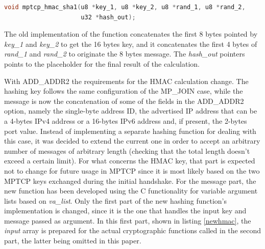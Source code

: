 \begin{lstlisting}[language=c, caption=\textit{Prototype for the old \textit{mptcp\_hmac\_sha1() function}}, label=oldhmac]
void mptcp_hmac_sha1(u8 *key_1, u8 *key_2, u8 *rand_1, u8 *rand_2, 
                     u32 *hash_out);
\end{lstlisting}
 
The old implementation of the function concatenates the first 8 bytes pointed by \textit{key\_1} and \textit{key\_2} to get the 16 bytes key, and it concatenates the first 4 bytes of \textit{rand\_1} and \textit{rand\_2} to originate the 8 bytes message. The \textit{hash\_out} pointers points to the placeholder for the final result of the calculation.


With ADD\_ADDR2 the requirements for the HMAC calculation change. The hashing key follows the same configuration of the MP\_JOIN case, while the message is now the concatenation of some of the fields in the ADD\_ADDR2 option, namely the single-byte address ID, the advertised IP address that can be a 4-bytes IPv4 address or a 16-bytes IPv6 address and, if present, the 2-bytes port value. Instead of implementing a separate hashing function for dealing with this case,  it was decided to extend the current one in order to accept an arbitrary number of messages of arbitrary length (checking that the total length doesn't exceed a certain limit). For what concerns the HMAC key, that part is expected not to change for future usage in MPTCP since it is most likely based on the two MPTCP keys exchanged during the initial handshake. For the message part, the new function has been developed using the C functionality for variable argument lists based on \textit{va\_list}. Only the first part of the new hashing function's implementation is changed, since it is the one that handles the input key and message passed as argument. In this first part, shown in listing \ref{newhmac}, the \textit{input} array is prepared for the actual cryptographic functions called in the second part, the latter being omitted in this paper.


